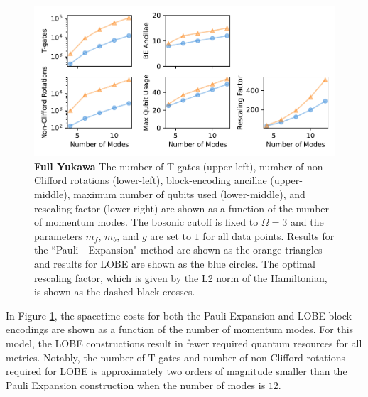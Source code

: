 \begin{figure}
    \label{fig:full-yukawa}
    \includegraphics[width = 16cm]{figures/full-yukawa-resolution-3.pdf}
    \caption{
        \textbf{Full Yukawa}
        The number of T gates (upper-left), number of non-Clifford rotations (lower-left), block-encoding ancillae (upper-middle), maximum number of qubits used (lower-middle), and rescaling factor (lower-right) are shown as a function of the number of momentum modes.
        The bosonic cutoff is fixed to $\Omega = 3$ and the parameters $m_f$, $m_b$, and $g$ are set to $1$ for all data points.
        Results for the ``Pauli - Expansion" method are shown as the orange triangles and results for LOBE are shown as the blue circles.
        The optimal rescaling factor, which is given by the L2 norm of the Hamiltonian, is shown as the dashed black crosses.
    }
\end{figure}

In Figure \ref{fig:full-yukawa}, the spacetime costs for both the Pauli Expansion and LOBE block-encodings are shown as a function of the number of momentum modes.
For this model, the LOBE constructions result in fewer required quantum resources for all metrics.
Notably, the number of T gates and number of non-Clifford rotations required for LOBE is approximately two orders of magnitude smaller than the Pauli Expansion construction when the number of modes is $12$.

